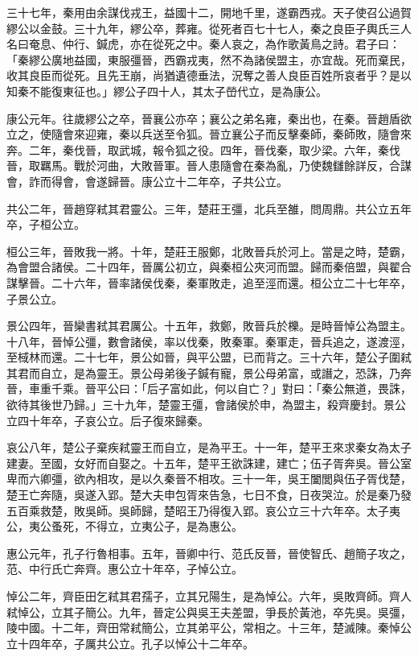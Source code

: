 \begin{pinyinscope}
三十七年，秦用由余謀伐戎王，益國十二，開地千里，遂霸西戎。天子使召公過賀繆公以金鼓。三十九年，繆公卒，葬雍。從死者百七十七人，秦之良臣子輿氏三人名曰奄息、仲行、鍼虎，亦在從死之中。秦人哀之，為作歌黃鳥之詩。君子曰：「秦繆公廣地益國，東服彊晉，西霸戎夷，然不為諸侯盟主，亦宜哉。死而棄民，收其良臣而從死。且先王崩，尚猶遺德垂法，況奪之善人良臣百姓所哀者乎？是以知秦不能復東征也。」繆公子四十人，其太子嵤代立，是為康公。

康公元年。往歲繆公之卒，晉襄公亦卒；襄公之弟名雍，秦出也，在秦。晉趙盾欲立之，使隨會來迎雍，秦以兵送至令狐。晉立襄公子而反擊秦師，秦師敗，隨會來奔。二年，秦伐晉，取武城，報令狐之役。四年，晉伐秦，取少梁。六年，秦伐晉，取羈馬。戰於河曲，大敗晉軍。晉人患隨會在秦為亂，乃使魏讎餘詳反，合謀會，詐而得會，會遂歸晉。康公立十二年卒，子共公立。

共公二年，晉趙穿弒其君靈公。三年，楚莊王彊，北兵至雒，問周鼎。共公立五年卒，子桓公立。

桓公三年，晉敗我一將。十年，楚莊王服鄭，北敗晉兵於河上。當是之時，楚霸，為會盟合諸侯。二十四年，晉厲公初立，與秦桓公夾河而盟。歸而秦倍盟，與翟合謀擊晉。二十六年，晉率諸侯伐秦，秦軍敗走，追至涇而還。桓公立二十七年卒，子景公立。

景公四年，晉欒書弒其君厲公。十五年，救鄭，敗晉兵於櫟。是時晉悼公為盟主。十八年，晉悼公彊，數會諸侯，率以伐秦，敗秦軍。秦軍走，晉兵追之，遂渡涇，至棫林而還。二十七年，景公如晉，與平公盟，已而背之。三十六年，楚公子圍弒其君而自立，是為靈王。景公母弟後子鍼有寵，景公母弟富，或譖之，恐誅，乃奔晉，車重千乘。晉平公曰：「后子富如此，何以自亡？」對曰：「秦公無道，畏誅，欲待其後世乃歸。」三十九年，楚靈王彊，會諸侯於申，為盟主，殺齊慶封。景公立四十年卒，子哀公立。后子復來歸秦。

哀公八年，楚公子棄疾弒靈王而自立，是為平王。十一年，楚平王來求秦女為太子建妻。至國，女好而自娶之。十五年，楚平王欲誅建，建亡；伍子胥奔吳。晉公室卑而六卿彊，欲內相攻，是以久秦晉不相攻。三十一年，吳王闔閭與伍子胥伐楚，楚王亡奔隨，吳遂入郢。楚大夫申包胥來告急，七日不食，日夜哭泣。於是秦乃發五百乘救楚，敗吳師。吳師歸，楚昭王乃得復入郢。哀公立三十六年卒。太子夷公，夷公蚤死，不得立，立夷公子，是為惠公。

惠公元年，孔子行魯相事。五年，晉卿中行、范氏反晉，晉使智氏、趙簡子攻之，范、中行氏亡奔齊。惠公立十年卒，子悼公立。

悼公二年，齊臣田乞弒其君孺子，立其兄陽生，是為悼公。六年，吳敗齊師。齊人弒悼公，立其子簡公。九年，晉定公與吳王夫差盟，爭長於黃池，卒先吳。吳彊，陵中國。十二年，齊田常弒簡公，立其弟平公，常相之。十三年，楚滅陳。秦悼公立十四年卒，子厲共公立。孔子以悼公十二年卒。


\end{pinyinscope}
